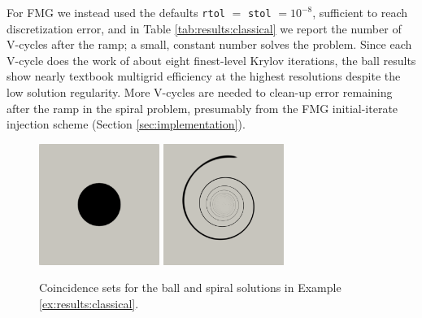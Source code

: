 \documentclass[review,hidelinks,onefignum,onetabnum]{siamart220329}
\begin{document}
\begin{example}
For FMG we instead used the defaults \texttt{rtol} $=$ \texttt{stol} $= 10^{-8}$, sufficient to reach discretization error, and in Table \ref{tab:results:classical} we report the number of V-cycles after the ramp; a small, constant number solves the problem.  Since each V-cycle does the work of about eight finest-level Krylov iterations, the ball results show nearly textbook multigrid efficiency at the highest resolutions despite the low solution regularity.  More V-cycles are needed to clean-up error remaining after the ramp in the spiral problem, presumably from the FMG initial-iterate injection scheme (Section \ref{sec:implementation}).
\end{example}

\begin{figure}[ht]
\centering
\includegraphics[width=0.35\textwidth]{fixfigs/ball-set.png} \qquad \includegraphics[width=0.35\textwidth]{fixfigs/spiral-set.png}
\caption{Coincidence sets for the ball and spiral solutions in Example \ref{ex:results:classical}.}
\label{fig:results:classical}
\end{figure}
\end{document}
